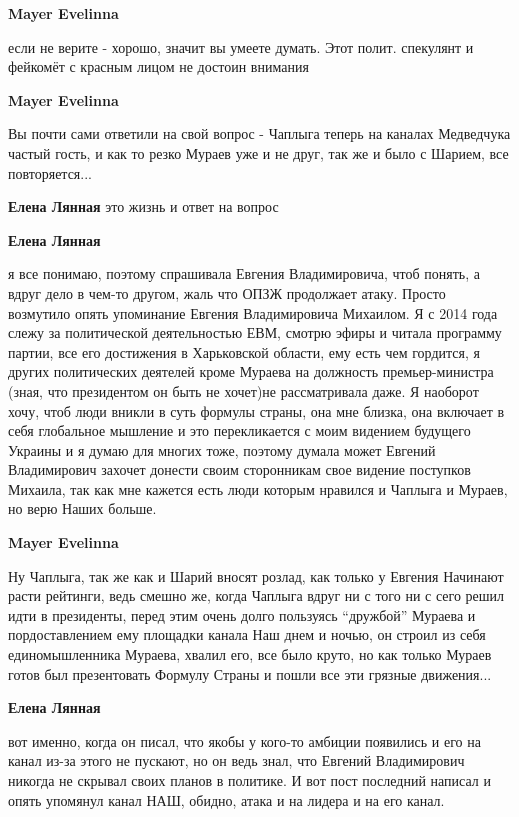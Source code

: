 \begin{itemize}
\begin{itemize}
\textbf{Mayer Evelinna} 

если не верите - хорошо, значит вы умеете думать. Этот полит. спекулянт и
фейкомёт с красным лицом не достоин внимания

\textbf{Mayer Evelinna} 

Вы почти сами ответили на свой вопрос - Чаплыга теперь на каналах Медведчука
частый гость, и как то резко Мураев уже и не друг, так же и было с Шарием, все
повторяется...

\textbf{Елена Лянная} это жизнь и ответ на вопрос

\textbf{Елена Лянная} 

я все понимаю, поэтому спрашивала Евгения Владимировича, чтоб понять, а вдруг
дело в чем-то другом, жаль что ОПЗЖ продолжает атаку. Просто возмутило опять
упоминание Евгения Владимировича Михаилом. Я с 2014 года слежу за политической
деятельностью ЕВМ, смотрю эфиры и читала программу партии, все его достижения в
Харьковской области, ему есть чем гордится, я других политических деятелей
кроме Мураева на должность премьер-министра (зная, что президентом он быть не
хочет)не рассматривала даже. Я наоборот хочу, чтоб люди вникли в суть формулы
страны, она мне близка, она включает в себя глобальное мышление и это
перекликается с моим видением будущего Украины и я думаю для многих тоже,
поэтому думала может Евгений Владимирович захочет донести своим сторонникам
свое видение поступков Михаила, так как мне кажется есть люди которым нравился
и Чаплыга и Мураев, но верю Наших больше.

\textbf{Mayer Evelinna} 

Ну Чаплыга, так же как и Шарий вносят розлад, как только у Евгения Начинают
расти рейтинги, ведь смешно же, когда Чаплыга вдруг ни с того ни с сего решил
идти в президенты, перед этим очень долго пользуясь \enquote{дружбой} Мураева и
пордоставлением ему площадки канала Наш днем и ночью, он строил из себя
единомышленника Мураева, хвалил его, все было круто, но как только Мураев готов
был презентовать Формулу Страны и пошли все эти грязные движения...

\textbf{Елена Лянная} 

вот именно, когда он писал, что якобы у кого-то амбиции появились и его на
канал из-за этого не пускают, но он ведь знал, что Евгений Владимирович никогда
не скрывал своих планов в политике. И вот пост последний написал и опять
упомянул канал НАШ, обидно, атака и на лидера и на его канал.


\end{itemize}
\end{itemize}
